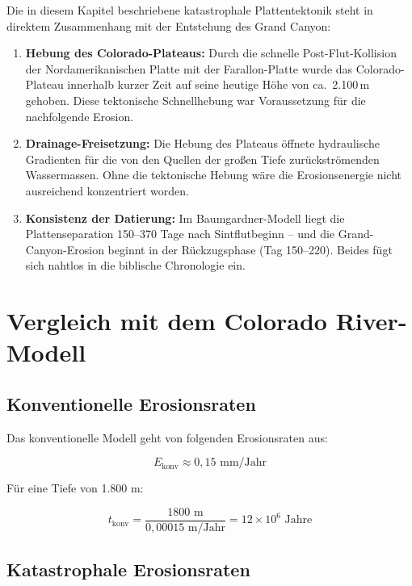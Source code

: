 ﻿\documentclass[12pt,a4paper]{report}
\begin{document}
Die in diesem Kapitel beschriebene katastrophale Plattentektonik steht in direktem Zusammenhang mit der Entstehung des Grand Canyon:

\begin{enumerate}
	\item \textbf{Hebung des Colorado-Plateaus:} Durch die schnelle Post-Flut-Kollision der Nordamerikanischen Platte mit der Farallon-Platte wurde das Colorado-Plateau innerhalb kurzer Zeit auf seine heutige Höhe von ca.\ 2.100\,m gehoben. Diese tektonische Schnellhebung war Voraussetzung für die nachfolgende Erosion.
	\item \textbf{Drainage-Freisetzung:} Die Hebung des Plateaus öffnete hydraulische Gradienten für die von den Quellen der großen Tiefe zurückströmenden Wassermassen. Ohne die tektonische Hebung wäre die Erosionsenergie nicht ausreichend konzentriert worden.
	\item \textbf{Konsistenz der Datierung:} Im Baumgardner-Modell liegt die Plattenseparation 150--370 Tage nach Sintflutbeginn -- und die Grand-Canyon-Erosion beginnt in der Rückzugsphase (Tag 150--220). Beides fügt sich nahtlos in die biblische Chronologie ein.
\end{enumerate}

\chapter{Vergleich mit dem Colorado River-Modell}

\section{Konventionelle Erosionsraten}

Das konventionelle Modell geht von folgenden Erosionsraten aus:

\begin{equation}
	E_{\text{konv}} \approx 0{,}15 \text{ mm/Jahr}
\end{equation}

Für eine Tiefe von 1.800 m:

\begin{equation}
	t_{\text{konv}} = \frac{1800 \text{ m}}{0{,}00015 \text{ m/Jahr}} = 12 \times 10^6 \text{ Jahre}
\end{equation}

\section{Katastrophale Erosionsraten}
\end{document}
